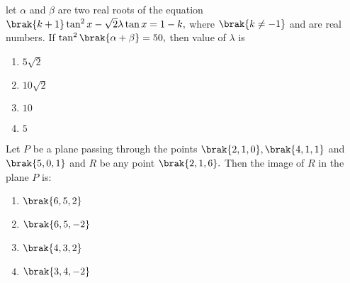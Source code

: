     \item let $\alpha$ and $\beta$ are two real roots of the equation $\brak{k+1}\tan^2{x}-\sqrt{2}\lambda\tan{x}=1-k,$ where $\brak{k\neq-1}$ and are real numbers. If $\tan^2\brak{\alpha+\beta}=50,$ then value of $\lambda$ is 
    \begin{enumerate}
        \item $5\sqrt{2}$
        \item $10\sqrt{2}$
        \item $10$
        \item $5$\\
    \end{enumerate}
    \item  Let $P$ be a plane passing through the points $\brak{2, 1, 0}, \brak{4, 1, 1}$ and $\brak{5, 0, 1}$ and $R$ be any point $\brak{2, 1, 6}.$ Then the image of $R$ in the plane $P$ is:
    \begin{enumerate}
        \item $\brak{6,5,2}$
        \item $\brak{6,5,-2}$
        \item $\brak{4,3,2}$
        \item $\brak{3,4,-2}$\\
    \end{enumerate} 
